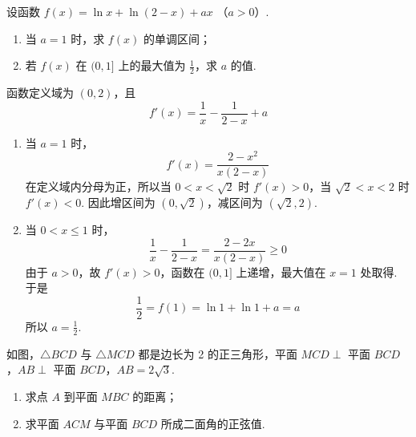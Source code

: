 \begin{problem}
设函数 \( f(x) = \ln x + \ln(2 - x) + ax \) （\(a > 0\)）.

\begin{enumerate}
\item 当 \(a = 1\) 时，求 \(f(x)\) 的单调区间；
\item 若 \(f(x)\) 在 \((0,1]\) 上的最大值为 \(\frac{1}{2}\)，求 \(a\) 的值.
\end{enumerate}
\end{problem}

\begin{solution}
函数定义域为 \((0,2)\)，且
\[
f'(x)=\frac1x-\frac1{2-x}+a
\]
\begin{enumerate}
\item 当 \(a=1\) 时，
\[
f'(x)=\frac{2-x^2}{x(2-x)}
\]
在定义域内分母为正，所以当 \(0<x<\sqrt2\) 时 \(f'(x)>0\)，当 \(\sqrt2<x<2\) 时 \(f'(x)<0\). 因此增区间为 \((0,\sqrt2)\)，减区间为 \((\sqrt2,2)\).
\item 当 \(0<x\leqslant1\) 时，
\[
\frac1x-\frac1{2-x}=\frac{2-2x}{x(2-x)}\geqslant0
\]
由于 \(a>0\)，故 \(f'(x)>0\)，函数在 \((0,1]\) 上递增，最大值在 \(x=1\) 处取得. 于是
\[
\frac12=f(1)=\ln1+\ln1+a=a
\]
所以 \(a=\frac12\).
\end{enumerate}
\end{solution}

\begin{problem}
如图，\(\triangle BCD\) 与 \(\triangle MCD\) 都是边长为 2 的正三角形，平面 \(MCD \perp\) 平面 \(BCD\)，\(AB \perp\) 平面 \(BCD\)，\(AB = 2\sqrt{3}\).

\begin{enumerate}
\item 求点 \(A\) 到平面 \(MBC\) 的距离；
\item 求平面 \(ACM\) 与平面 \(BCD\) 所成二面角的正弦值.
\end{enumerate}
\end{problem}

